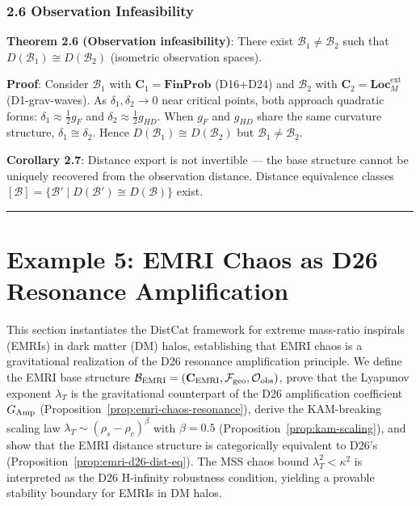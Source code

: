 \documentclass[
]{article}
\begin{document}
\subsubsection{2.6 Observation
Infeasibility}\label{observation-infeasibility}

\textbf{Theorem 2.6 (Observation infeasibility)}: There exist
\(\mathcal{B}_1 \neq \mathcal{B}_2\) such that
\(D(\mathcal{B}_1) \cong D(\mathcal{B}_2)\) (isometric observation
spaces).

\textbf{Proof}: Consider \(\mathcal{B}_1\) with
\(\mathbf{C}_1 = \mathbf{FinProb}\) (D16+D24) and \(\mathcal{B}_2\) with
\(\mathbf{C}_2 = \mathbf{Loc}_M^{\text{ext}}\) (D1-grav-waves). As
\(\delta_1, \delta_2 \to 0\) near critical points, both approach
quadratic forms: \(\delta_1 \approx \frac{1}{2} g_F\) and
\(\delta_2 \approx \frac{1}{2} g_{HD}\). When \(g_F\) and \(g_{HD}\)
share the same curvature structure, \(\delta_1 \cong \delta_2\). Hence
\(D(\mathcal{B}_1) \cong D(\mathcal{B}_2)\) but
\(\mathcal{B}_1 \neq \mathcal{B}_2\).

\textbf{Corollary 2.7}: Distance export is not invertible --- the base
structure cannot be uniquely recovered from the observation distance.
Distance equivalence classes
\([\mathcal{B}] = \{\mathcal{B}' \mid D(\mathcal{B}') \cong D(\mathcal{B})\}\)
exist.

\begin{center}\rule{0.5\linewidth}{0.5pt}\end{center}


\section{Example 5: EMRI Chaos as D26 Resonance Amplification}\label{sec:example5-emri}

This section instantiates the DistCat framework for extreme mass-ratio inspirals (EMRIs) in dark matter (DM) halos, establishing that EMRI chaos is a gravitational realization of the D26 resonance amplification principle. We define the EMRI base structure $\mathcal{B}_{\rm EMRI} = (\mathbf{C}_{\rm EMRI}, \mathcal{F}_{\rm geo}, \mathcal{O}_{\rm obs})$, prove that the Lyapunov exponent $\lambda_T$ is the gravitational counterpart of the D26 amplification coefficient $G_{\rm Amp}$ (Proposition~\ref{prop:emri-chaos-resonance}), derive the KAM-breaking scaling law $\lambda_T \sim (\rho_s - \rho_c)^\beta$ with $\beta = 0.5$ (Proposition~\ref{prop:kam-scaling}), and show that the EMRI distance structure is categorically equivalent to D26's (Proposition~\ref{prop:emri-d26-dist-eq}). The MSS chaos bound $\lambda_T^2 < \kappa^2$ is interpreted as the D26 H-infinity robustness condition, yielding a provable stability boundary for EMRIs in DM halos.
\end{document}
